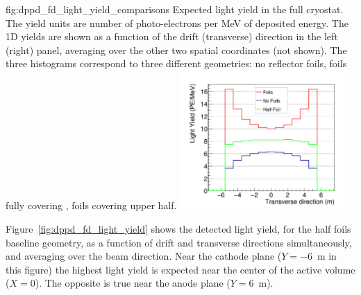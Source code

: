 \begin{dunefigure}{fig:dppd_fd_light_yield_comparisons}
{Expected light yield in the full   cryostat. The yield units are number of photo-electrons per \si{\MeV} of deposited energy. The 1D yields are shown as a function of the drift (transverse) direction in the left (right) panel, averaging over the other two spatial coordinates (not shown). The three histograms correspond to three different geometries: no  reflector foils, foils fully covering , foils covering upper  half.}
 \hfill
\includegraphics[width=0.49\textwidth]{graphics/dppd_PhotLibProjectionComparison_Trans.pdf}
\end{dunefigure}
  


Figure~\ref{fig:dppd_fd_light_yield} shows the detected light yield, for the half foils baseline geometry, as a function of drift and transverse directions simultaneously, and averaging over the beam direction. Near the cathode plane ($Y=$\SI{-6}{m} in this figure) the highest light yield is expected near the center of the active volume ($X=0$). The opposite is true near the anode plane ($Y=$\SI{+6}{m}).  

